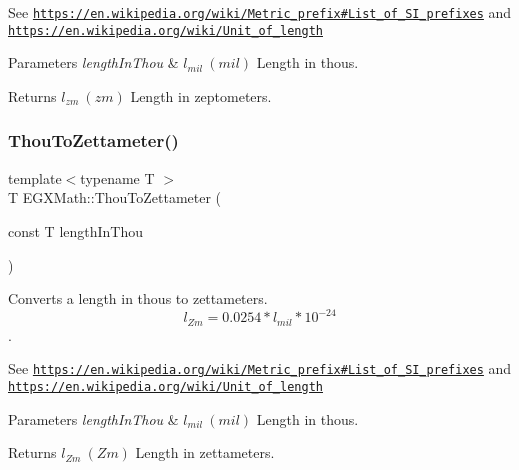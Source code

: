 See \href{https://en.wikipedia.org/wiki/Metric_prefix#List_of_SI_prefixes}{\tt https\+://en.\+wikipedia.\+org/wiki/\+Metric\+\_\+prefix\#\+List\+\_\+of\+\_\+\+S\+I\+\_\+prefixes} and \href{https://en.wikipedia.org/wiki/Unit_of_length}{\tt https\+://en.\+wikipedia.\+org/wiki/\+Unit\+\_\+of\+\_\+length} 
\begin{DoxyParams}{Parameters}
{\em length\+In\+Thou} & $ l_{mil}\ (mil)$ Length in thous. \\
\hline
\end{DoxyParams}
\begin{DoxyReturn}{Returns}
$ l_{zm}\ (zm)$ Length in zeptometers. 
\end{DoxyReturn}
\mbox{\label{group___e_g_x_math-_conversions-_length_conversions-_imperial-_thou-_s_i_ga388e6005a2fec0fb3e52db46841eacef}} 
\subsubsection{\texorpdfstring{Thou\+To\+Zettameter()}{ThouToZettameter()}}
{\footnotesize\ttfamily template$<$typename T $>$ \\
T E\+G\+X\+Math\+::\+Thou\+To\+Zettameter (\begin{DoxyParamCaption}\item[{const T}]{length\+In\+Thou }\end{DoxyParamCaption})}



Converts a length in thous to zettameters. \[ l_{Zm}=0.0254 * l_{mil} * 10^{-24} \]. 

See \href{https://en.wikipedia.org/wiki/Metric_prefix#List_of_SI_prefixes}{\tt https\+://en.\+wikipedia.\+org/wiki/\+Metric\+\_\+prefix\#\+List\+\_\+of\+\_\+\+S\+I\+\_\+prefixes} and \href{https://en.wikipedia.org/wiki/Unit_of_length}{\tt https\+://en.\+wikipedia.\+org/wiki/\+Unit\+\_\+of\+\_\+length} 
\begin{DoxyParams}{Parameters}
{\em length\+In\+Thou} & $ l_{mil}\ (mil)$ Length in thous. \\
\hline
\end{DoxyParams}
\begin{DoxyReturn}{Returns}
$ l_{Zm}\ (Zm)$ Length in zettameters. 
\end{DoxyReturn}
